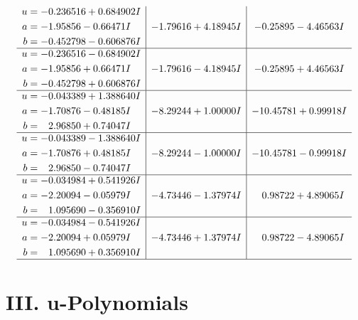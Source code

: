 \documentclass[1p]{elsarticle_modified}
\theoremstyle{definition}
\begin{document}
$$\begin{array}{c|c|c}
\begin{aligned}
u &= -0.236516 + 0.684902 I \\
a &= -1.95856 - 0.66471 I \\
b &= -0.452798 - 0.606876 I\end{aligned}
 & -1.79616 + 4.18945 I & -0.25895 - 4.46563 I \\ \hline\begin{aligned}
u &= -0.236516 - 0.684902 I \\
a &= -1.95856 + 0.66471 I \\
b &= -0.452798 + 0.606876 I\end{aligned}
 & -1.79616 - 4.18945 I & -0.25895 + 4.46563 I \\ \hline\begin{aligned}
u &= -0.043389 + 1.388640 I \\
a &= -1.70876 - 0.48185 I \\
b &= \phantom{-}2.96850 + 0.74047 I\end{aligned}
 & -8.29244 + 1.00000 I & -10.45781 + 0.99918 I \\ \hline\begin{aligned}
u &= -0.043389 - 1.388640 I \\
a &= -1.70876 + 0.48185 I \\
b &= \phantom{-}2.96850 - 0.74047 I\end{aligned}
 & -8.29244 - 1.00000 I & -10.45781 - 0.99918 I \\ \hline\begin{aligned}
u &= -0.034984 + 0.541926 I \\
a &= -2.20094 - 0.05979 I \\
b &= \phantom{-}1.095690 - 0.356910 I\end{aligned}
 & -4.73446 - 1.37974 I & \phantom{-}0.98722 + 4.89065 I \\ \hline\begin{aligned}
u &= -0.034984 - 0.541926 I \\
a &= -2.20094 + 0.05979 I \\
b &= \phantom{-}1.095690 + 0.356910 I\end{aligned}
 & -4.73446 + 1.37974 I & \phantom{-}0.98722 - 4.89065 I\\
 \hline 
 \end{array}$$\newpage
\newpage\renewcommand{\arraystretch}{1}
\centering \section*{ III. u-Polynomials}
\end{document}
